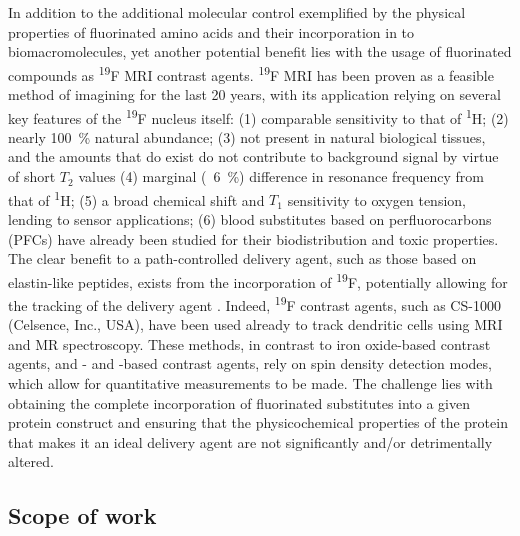 \begin{refsection}
In addition to the additional molecular control exemplified by the physical
properties of fluorinated amino acids and their incorporation in to
biomacromolecules, yet another potential benefit lies with the usage of
fluorinated compounds as \textsuperscript{19}F MRI contrast agents.
\textsuperscript{19}F MRI has been proven as a feasible method of imagining for
the last 20 years,\cite{Srinivas2010,Nelson1985} with its application relying on
several key features of the \textsuperscript{19}F nucleus itself:
(1) comparable sensitivity to that of \textsuperscript{1}H;
(2) nearly \SI{100}{\percent} natural abundance;
(3) not present in natural biological tissues, and the amounts that do exist do
not contribute to background signal by virtue of short ${T_{2}}$ values
(4) marginal (~\SI{6}{\percent}) difference in resonance frequency from that of
\textsuperscript{1}H;
(5) a broad chemical shift and ${T_{1}}$ sensitivity to oxygen tension, lending
to  sensor applications; 
(6) blood substitutes based on perfluorocarbons (PFCs) have already been studied
for their biodistribution and toxic properties.
The clear benefit to a path-controlled delivery agent, such as those based on
elastin-like peptides, exists from the incorporation of \textsuperscript{19}F,
potentially allowing for the tracking of the delivery agent .
Indeed, \textsuperscript{19}F contrast agents, such as CS-1000 (Celsence, Inc.,
USA), have been used already to track dendritic cells  using MRI
and MR spectroscopy.\cite{Bonetto2010} These methods, in contrast to iron
oxide-based contrast agents, and - and -based contrast
agents, rely on spin density detection modes, which allow for quantitative
measurements to be made.\cite{Srinivas2010} The challenge lies with obtaining
the complete incorporation of fluorinated substitutes into a given protein
construct and ensuring that the physicochemical properties of the protein that
makes it an ideal delivery agent are not significantly and/or detrimentally
altered.

\subsection{Scope of work}


\end{refsection}
